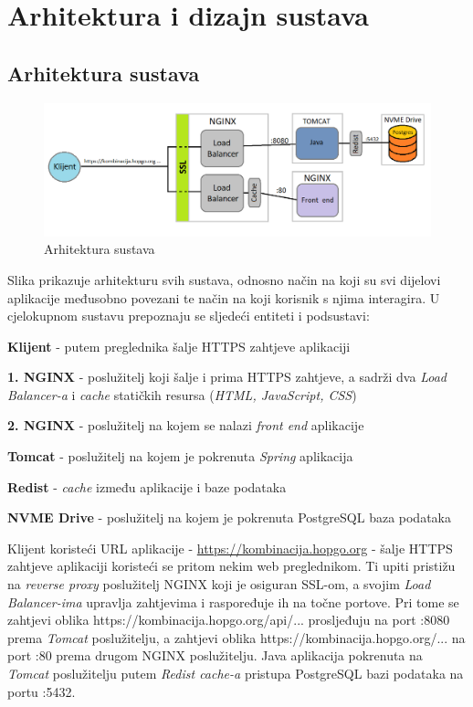 \chapter{Arhitektura i dizajn sustava}

		\section{Arhitektura sustava}
		\begin{figure}[H]
			\includegraphics[scale=0.5]{figures/system-architecture.png}
			\centering
			\caption{Arhitektura sustava}
			\label{fig:sys-arch}
		\end{figure}
	
		Slika prikazuje arhitekturu svih sustava, odnosno način na koji su svi dijelovi aplikacije međusobno povezani te način na koji korisnik s njima interagira.
		U cjelokupnom sustavu prepoznaju se sljedeći entiteti i podsustavi:
		\begin{packed_item}
			\item \textbf{Klijent} - putem preglednika šalje HTTPS zahtjeve aplikaciji
			\item \textbf{1. NGINX} - poslužitelj koji šalje i prima HTTPS zahtjeve, a sadrži dva \textit{Load Balancer-a} i \textit{cache} statičkih resursa (\textit{HTML, JavaScript, CSS})
			\item \textbf{2. NGINX} - poslužitelj na kojem se nalazi \textit{front end} aplikacije
			\item \textbf{Tomcat} - poslužitelj na kojem je pokrenuta \textit{Spring} aplikacija
			\item \textbf{Redist} - \textit{cache} između aplikacije i baze podataka
			\item \textbf{NVME Drive} - poslužitelj na kojem je pokrenuta PostgreSQL baza podataka
		\end{packed_item}
	
		Klijent koristeći URL aplikacije - \url{https://kombinacija.hopgo.org} - šalje HTTPS zahtjeve aplikaciji koristeći se pritom nekim web preglednikom. Ti upiti pristižu na \textit{reverse proxy} poslužitelj NGINX koji je osiguran SSL-om, a svojim \textit{Load Balancer-ima} upravlja zahtjevima i raspoređuje ih na točne portove. Pri tome se zahtjevi oblika https://kombinacija.hopgo.org/api/... prosljeđuju na port :8080 prema \textit{Tomcat} poslužitelju, a zahtjevi oblika https://kombinacija.hopgo.org/... na port :80 prema drugom NGINX poslužitelju.
		Java aplikacija pokrenuta na \textit{Tomcat} poslužitelju putem \textit{Redist cache-a} pristupa PostgreSQL bazi podataka na portu :5432.
		
